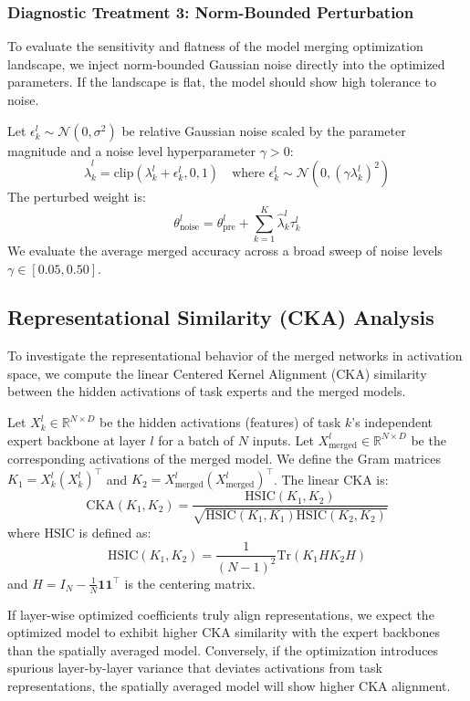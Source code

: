 \subsubsection{Diagnostic Treatment 3: Norm-Bounded Perturbation}
To evaluate the sensitivity and flatness of the model merging optimization landscape, we inject norm-bounded Gaussian noise directly into the optimized parameters. If the landscape is flat, the model should show high tolerance to noise.

Let $\epsilon^l_k \sim \mathcal{N}(0, \sigma^2)$ be relative Gaussian noise scaled by the parameter magnitude and a noise level hyperparameter $\gamma > 0$:
\begin{equation}
    \hat{\lambda}^l_k = \text{clip}\left(\lambda^l_k + \epsilon^l_k, 0, 1\right) \quad \text{where } \epsilon^l_k \sim \mathcal{N}\left(0, \left(\gamma \lambda^l_k\right)^2\right)
\end{equation}
The perturbed weight is:
\begin{equation}
    \theta^l_{\text{noise}} = \theta^l_{\text{pre}} + \sum_{k=1}^K \hat{\lambda}^l_k \tau^l_k
\end{equation}
We evaluate the average merged accuracy across a broad sweep of noise levels $\gamma \in [0.05, 0.50]$.

\subsection{Representational Similarity (CKA) Analysis}
To investigate the representational behavior of the merged networks in activation space, we compute the linear Centered Kernel Alignment (CKA) similarity between the hidden activations of task experts and the merged models.

Let $X^l_k \in \mathbb{R}^{N \times D}$ be the hidden activations (features) of task $k$'s independent expert backbone at layer $l$ for a batch of $N$ inputs. Let $X^l_{\text{merged}} \in \mathbb{R}^{N \times D}$ be the corresponding activations of the merged model. We define the Gram matrices $K_1 = X^l_k (X^l_k)^\top$ and $K_2 = X^l_{\text{merged}} (X^l_{\text{merged}})^\top$. The linear CKA is:
\begin{equation}
    \text{CKA}(K_1, K_2) = \frac{\text{HSIC}(K_1, K_2)}{\sqrt{\text{HSIC}(K_1, K_1) \text{HSIC}(K_2, K_2)}}
\end{equation}
where $\text{HSIC}$ is defined as:
\begin{equation}
    \text{HSIC}(K_1, K_2) = \frac{1}{(N-1)^2} \text{Tr}(K_1 H K_2 H)
\end{equation}
and $H = I_N - \frac{1}{N} \mathbf{1}\mathbf{1}^\top$ is the centering matrix. 

If layer-wise optimized coefficients truly align representations, we expect the optimized model to exhibit higher CKA similarity with the expert backbones than the spatially averaged model. Conversely, if the optimization introduces spurious layer-by-layer variance that deviates activations from task representations, the spatially averaged model will show higher CKA alignment.
